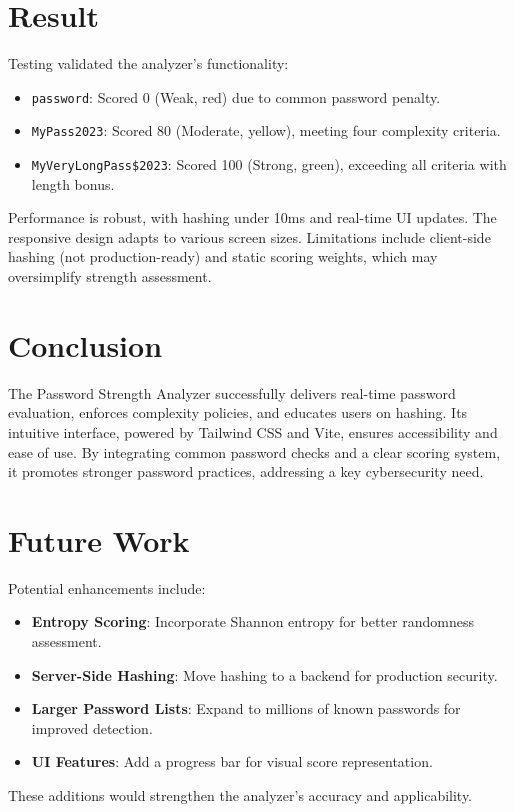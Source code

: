 \documentclass[11pt,a4paper]{report}
\begin{document}
\section{Result}
Testing validated the analyzer’s functionality:
\begin{itemize}
    \item \texttt{password}: Scored 0 (Weak, red) due to common password penalty.
    \item \texttt{MyPass2023}: Scored 80 (Moderate, yellow), meeting four complexity criteria.
    \item \texttt{MyVeryLongPass\$2023}: Scored 100 (Strong, green), exceeding all criteria with length bonus.
\end{itemize}
Performance is robust, with hashing under 10ms and real-time UI updates. The responsive design adapts to various screen sizes. Limitations include client-side hashing (not production-ready) and static scoring weights, which may oversimplify strength assessment.

\section{Conclusion}
The Password Strength Analyzer successfully delivers real-time password evaluation, enforces complexity policies, and educates users on hashing. Its intuitive interface, powered by Tailwind CSS and Vite, ensures accessibility and ease of use. By integrating common password checks and a clear scoring system, it promotes stronger password practices, addressing a key cybersecurity need.

\section{Future Work}
Potential enhancements include:
\begin{itemize}
    \item \textbf{Entropy Scoring}: Incorporate Shannon entropy for better randomness assessment.
    \item \textbf{Server-Side Hashing}: Move hashing to a backend for production security.
    \item \textbf{Larger Password Lists}: Expand to millions of known passwords for improved detection.
    \item \textbf{UI Features}: Add a progress bar for visual score representation.
\end{itemize}
These additions would strengthen the analyzer’s accuracy and applicability.

\appendix
\end{document}
